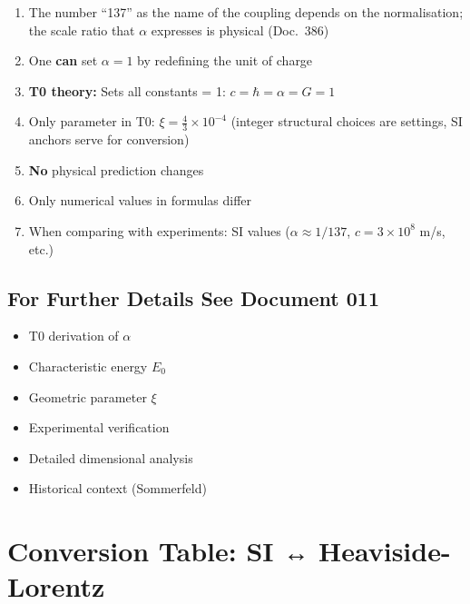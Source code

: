 	\begin{enumerate}
		\item The number ``137'' as the name of the coupling depends on the normalisation; the scale ratio that $\alpha$ expresses is physical (Doc.~386)
		
		\item One \textbf{can} set $\alpha = 1$ by redefining the unit of charge
		
		\item \textbf{T0 theory:} Sets all constants = 1: $c = \hbar = \alpha = G = 1$
		
		\item Only parameter in T0: $\xi = \frac{4}{3} \times 10^{-4}$ (integer structural choices are settings, SI anchors serve for conversion)
		
		\item \textbf{No} physical prediction changes
		
		\item Only numerical values in formulas differ
		
		\item When comparing with experiments: SI values ($\alpha \approx 1/137$, $c = 3 \times 10^8$ m/s, etc.)
	\end{enumerate}
	
	\subsection{For Further Details See Document 011}
	
	\begin{itemize}
		\item T0 derivation of $\alpha$
		\item Characteristic energy $E_0$
		\item Geometric parameter $\xi$
		\item Experimental verification
		\item Detailed dimensional analysis
		\item Historical context (Sommerfeld)
	\end{itemize}
	
	\appendix
	
	\section{Conversion Table: SI ↔ Heaviside-Lorentz}
	
